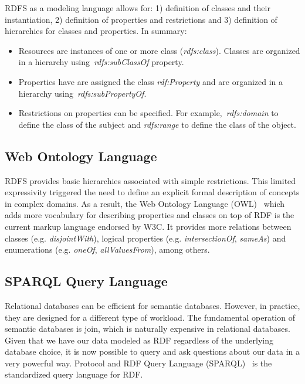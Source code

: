 RDFS as a modeling language allows for: 1) definition of classes and their instantiation, 2) definition of properties and restrictions and 3) definition of hierarchies for classes and properties. In summary:

\begin{itemize}
	\item Resources are instances of one or more class (\emph{rdfs:class}). Classes are organized in a hierarchy using~\emph{rdfs:subClassOf} property.
	\item Properties have are assigned the class \emph{rdf:Property} and are organized in a hierarchy using~\emph{rdfs:subPropertyOf}.
	\item Restrictions on properties can be specified. For example,~\emph{rdfs:domain} to define the class of the subject and \emph{rdfs:range} to define the class of the object.
\end{itemize}

\subsection{Web Ontology Language}

RDFS provides basic hierarchies associated with simple restrictions. This limited expressivity triggered the need to define an explicit formal description of concepts in complex domains. As a result, the Web Ontology Language (OWL)~\cite{W3C:OWL:12} which adds more vocabulary for describing properties and classes on top of RDF is the current markup language endorsed by W3C. It provides more relations between classes (e.g. \emph{disjointWith}), logical properties (e.g. \emph{intersectionOf}, \emph{sameAs}) and enumerations (e.g. \emph{oneOf}, \emph{allValuesFrom}), among others.

\subsection{SPARQL Query Language}

Relational databases can be efficient for semantic databases. However, in practice, they are designed for a different type of workload. The fundamental operation of semantic databases is join, which is naturally expensive in relational databases. Given that we have our data modeled as RDF regardless of the underlying database choice, it is now possible to query and ask questions about our data in a very powerful way. Protocol and RDF Query Language (SPARQL)~\cite{Prud:SPARQL:08} is the standardized query language for RDF.

